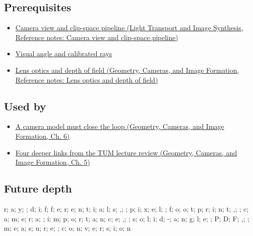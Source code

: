 \subsection{Prerequisites}\label{appendix-8c40fad29462-prerequisites}

\hypertarget{appendix-8c40fad29462-prerequisites}{}

\begin{itemize}
\tightlist
\item
  \href{../04-Light-Transport-and-Image-Synthesis/main.pdf\#nameddest=appendix-1c07d64f5e70}{Camera view and clip-space pipeline (Light Transport and Image Synthesis, Reference notes: Camera view and clip-space pipeline)}
\item
  \hyperref[appendix-7d356c396d1a]{Visual angle and calibrated rays}
\item
  \href{../03-Geometry-Cameras-and-Image-Formation/main.pdf\#nameddest=appendix-21f8456e2629}{Lens optics and depth of field (Geometry, Cameras, and Image Formation, Reference notes: Lens optics and depth of field)}
\end{itemize}

\subsection{Used by}\label{appendix-8c40fad29462-used-by}

\hypertarget{appendix-8c40fad29462-used-by}{}

\begin{itemize}
\tightlist
\item
  \href{../03-Geometry-Cameras-and-Image-Formation/main.pdf\#nameddest=02-foundations-ii-ch037-a-camera-model-must-close-the-loop}{A camera model must close the loop (Geometry, Cameras, and Image Formation, Ch. 6)}
\item
  \href{../03-Geometry-Cameras-and-Image-Formation/main.pdf\#nameddest=02-foundations-ii-ch036-four-deeper-links-from-the-tum-lecture-review}{Four deeper links from the TUM lecture review (Geometry, Cameras, and Image Formation, Ch. 5)}
\end{itemize}

\subsection{Future depth}\label{appendix-8c40fad29462-future-depth}

\hypertarget{appendix-8c40fad29462-future-depth}{}

r; a; y; ; d; i; f; f; e; r; e; n; t; i; a; l; s; ,; ; p; i; x; e; l; ; f; o; o; t; p; r; i; n; t; ,; ; c; a; m; e; r; a; ; i; m; p; o; r; t; a; n; c; e; ,; ; s; o; l; i; d; -; a; n; g; l; e; ; P; D; F; ,; ; m; e; a; s; u; r; e; ; c; o; n; v; e; r; s; i; o; n
